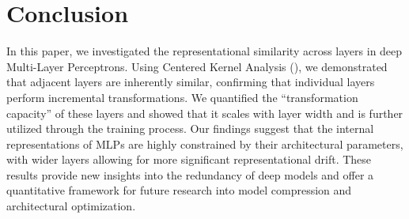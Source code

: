 \section{Conclusion}
\label{sec:conclusion}

In this paper, we investigated the representational similarity across layers in deep Multi-Layer Perceptrons. Using Centered Kernel Analysis (\cka), we demonstrated that adjacent layers are inherently similar, confirming that individual layers perform incremental transformations. We quantified the ``transformation capacity'' of these layers and showed that it scales with layer width and is further utilized through the training process. Our findings suggest that the internal representations of MLPs are highly constrained by their architectural parameters, with wider layers allowing for more significant representational drift. These results provide new insights into the redundancy of deep models and offer a quantitative framework for future research into model compression and architectural optimization.

